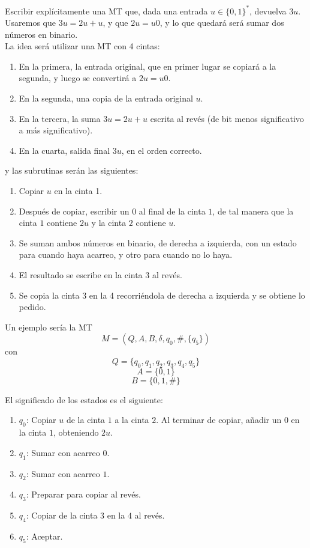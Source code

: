 \documentclass[12pt]{article}
\begin{document}
    \begin{ejercicio}
        Escribir explícitamente una MT que, dada una entrada $u \in \{0,1\}^{*}$,
        devuelva $3u$. \\

        Usaremos que $3u = 2u + u$, y que $2u = u0$, y lo que quedará será
        sumar dos números en binario. \\

        La idea será utilizar una MT con 4 cintas:
        \begin{enumerate}
            \item En la primera, la entrada original, que en primer lugar se copiará a la
            segunda, y luego se convertirá a $2u = u0$.
            \item En la segunda, una copia de la entrada original $u$.
            \item En la tercera, la suma $3u = 2u + u$ escrita al revés (de bit 
            menos significativo a más significativo).
            \item En la cuarta, salida final $3u$, en el orden correcto.
        \end{enumerate}
        y las subrutinas serán las siguientes:
        \begin{enumerate}
            \item Copiar $u$ en la cinta 1.
            \item Después de copiar, escribir un $0$ al final de la cinta $1$,
            de tal manera que la cinta $1$ contiene $2u$ y la cinta $2$ contiene
            $u$.
            \item Se suman ambos números en binario, de derecha a izquierda, con
            un estado para cuando haya acarreo, y otro para cuando no lo haya.
            \item El resultado se escribe en la cinta 3 al revés.
            \item Se copia la cinta 3 en la 4 recorriéndola de derecha 
            a izquierda y se obtiene lo pedido.
        \end{enumerate}


        Un ejemplo sería la MT $$M = (Q,A,B, \delta, q_0, \#, \{q_5\})$$
        con 
        $$Q = \{q_0, q_1, q_2, q_3, q_4, q_5\}$$
        $$A = \{0,1\}$$
        $$B = \{0,1, \#\}$$

        \newpage

        El significado de los estados es el siguiente:
        \begin{enumerate}
            \item $q_0$: Copiar $u$ de la cinta $1$ a la cinta $2$. Al terminar
            de copiar, añadir un $0$ en la cinta $1$, obteniendo $2u$.
            \item $q_1$: Sumar con acarreo $0$.
            \item $q_2$: Sumar con acarreo $1$. 
            \item $q_3$: Preparar para copiar al revés.
            \item $q_4$: Copiar de la cinta $3$ en la $4$ al revés.
            \item $q_5$: Aceptar.
        \end{enumerate}


\end{ejercicio}
\end{document}
